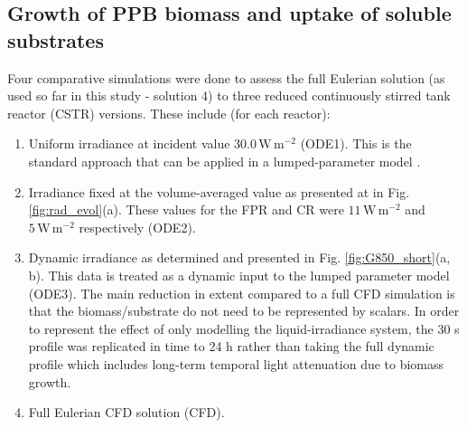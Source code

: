 \subsection{Growth of PPB biomass and uptake of soluble substrates}
\label{ssec:ppb_growth}
Four comparative simulations were done to assess the full Eulerian solution (as used so far in this study - solution 4) to three reduced continuously stirred tank reactor (CSTR) versions. These include (for each reactor):

\begin{enumerate}
    \item Uniform irradiance at incident value $\mathrm{30.0\, W\, m^{-2}}$ (ODE1). This is the standard approach that can be applied in a lumped-parameter model \cite{bechet2013}.
    \item Irradiance fixed at the volume-averaged value as presented at in Fig. \ref{fig:rad_evol}(a). These values for the FPR and CR were $\mathrm{11\, W\, m^{-2}}$ and $\mathrm{5\, W\, m^{-2}}$ respectively (ODE2).
    \item Dynamic irradiance as determined and presented in Fig. \ref{fig:G850_short}(a, b). This data is treated as a dynamic input to the lumped parameter model (ODE3). The main reduction in extent compared to a full CFD simulation is that the biomass/substrate do not need to be represented by scalars. In order to represent the effect of only modelling the liquid-irradiance system, the 30 s profile was replicated in time to 24 h rather than taking the full dynamic profile which includes long-term temporal light attenuation due to biomass growth.
    \item Full Eulerian CFD solution (CFD).
\end{enumerate}

